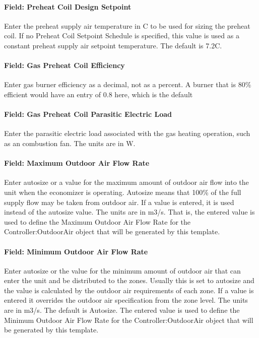 \paragraph{Field: Preheat Coil Design Setpoint}\label{field-preheat-coil-design-setpoint}

Enter the preheat supply air temperature in C to be used for sizing the preheat coil. If no Preheat Coil Setpoint Schedule is specified, this value is used as a constant preheat supply air setpoint temperature. The default is 7.2C.

\paragraph{Field: Gas Preheat Coil Efficiency}\label{field-gas-preheat-coil-efficiency}

Enter gas burner efficiency as a decimal, not as a percent. A burner that is 80\% efficient would have an entry of 0.8 here, which is the default

\paragraph{Field: Gas Preheat Coil Parasitic Electric Load}\label{field-gas-preheat-coil-parasitic-electric-load}

Enter the parasitic electric load associated with the gas heating operation, such as an combustion fan. The units are in W.

\paragraph{Field: Maximum Outdoor Air Flow Rate}\label{field-maximum-outdoor-air-flow-rate-3}

Enter autosize or a value for the maximum amount of outdoor air flow into the unit when the economizer is operating. Autosize means that 100\% of the full supply flow may be taken from outdoor air. If a value is entered, it is used instead of the autosize value. The units are in m3/s. That is, the entered value is used to define the Maximum Outdoor Air Flow Rate for the Controller:OutdoorAir object that will be generated by this template.

\paragraph{Field: Minimum Outdoor Air Flow Rate}\label{field-minimum-outdoor-air-flow-rate-3}

Enter autosize or the value for the minimum amount of outdoor air that can enter the unit and be distributed to the zones. Usually this is set to autosize and the value is calculated by the outdoor air requirements of each zone. If a value is entered it overrides the outdoor air specification from the zone level. The units are in m3/s. The default is Autosize. The entered value is used to define the Minimum Outdoor Air Flow Rate for the Controller:OutdoorAir object that will be generated by this template.

